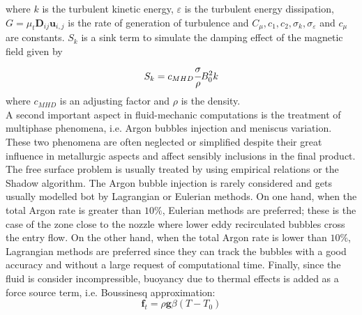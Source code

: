 where $k$ is the turbulent kinetic energy, $\varepsilon$ is the turbulent energy dissipation, $G=\mu_t \textbf{D}_{ij}\textbf{u}_{i,j}$ is the rate of generation of turbulence and $C_{\mu},c_1,c_2,\sigma_k,\sigma_{\varepsilon}$ and $c_{\mu}$ are constants. $S_k$ is a sink term to simulate the damping effect of the magnetic field given by
\begin{equation}
S_k=c_{MHD}\cfrac{\sigma}{\rho}B_{0}^{2}k
\end{equation}
where $c_{MHD}$ is an adjusting factor and $\rho$ is the density.\\
A second important aspect in fluid-mechanic computations is the treatment of multiphase phenomena, i.e. Argon bubbles injection and meniscus variation. These two phenomena are often neglected or simplified despite their great influence in metallurgic aspects and affect sensibly inclusions in the final product. The free surface problem is usually treated by using empirical relations or the Shadow algorithm\cite{Fujisaki2001}. The Argon bubble injection is rarely considered and gets usually modelled bot by Lagrangian or Eulerian methods. On one hand, when the total Argon rate is greater than $10\%$, Eulerian methods are preferred; these is the case of the zone close to the nozzle where lower eddy recirculated bubbles cross the entry flow. On the other hand, when the total Argon rate is lower than $10\%$, Lagrangian methods are preferred since they can track the bubbles with a good accuracy and without a large request of computational time. Finally, since the fluid is consider incompressible, buoyancy due to thermal effects is added as a force source term, i.e. Boussinesq approximation\cite{2007}:
\begin{equation}
\textbf{f}_t=\rho \textbf{g}\beta(T-T_0)
\end{equation}


